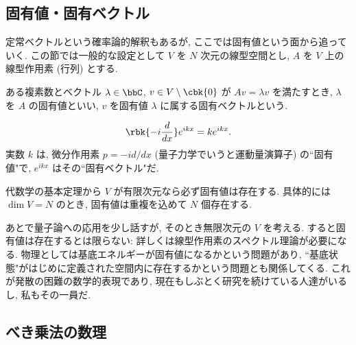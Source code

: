 \documentclass[openany, a4paper, oneside]{jsbook}
\begin{document}
\subsection{固有値・固有ベクトル}

定常ベクトルという確率論的解釈もあるが,
ここでは固有値という面から追っていく.
この節では一般的な設定として $V$ を $N$ 次元の線型空間とし,
$A$ を $V$ 上の線型作用素 (行列) とする.
\begin{defn}
ある複素数とベクトル $\lambda \in \bbC$, $v \in V \setminus \cbk{0}$ が
$A v = \lambda v$ を満たすとき, $\lambda$ を $A$ の固有値といい,
$v$ を固有値 $\lambda$ に属する固有ベクトルという.
\end{defn}
\begin{ex}[かなりいいかげん]
$$ \rbk{ -i \frac{ d }{dx} } e^{ikx} = k e^{ikx}. $$
実数 $k$ は, 微分作用素 $p = - i d/dx$ (量子力学でいうと運動量演算子) の``固有値"で,
$e^{ikx}$ はその``固有ベクトル"だ.
\end{ex}
\begin{rem}
代数学の基本定理から $V$ が有限次元なら必ず固有値は存在する.
具体的には $\dim V = N$ のとき, 固有値は重複を込めて $N$ 個存在する.
\end{rem}
\begin{rem}
あとで量子論への応用を少し話すが, そのとき無限次元の $V$ を考える.
すると固有値は存在するとは限らない: 詳しくは線型作用素のスペクトル理論が必要になる.
物理としては基底エネルギーが固有値になるかという問題があり,
``基底状態"がはじめに定義された空間内に存在するかという問題とも関係してくる.
これが発散の困難の数学的表現であり, 現在もしぶとく研究を続けている人達がいるし, 私もその一員だ.
\end{rem}
\subsection{べき乗法の数理}
\end{document}
